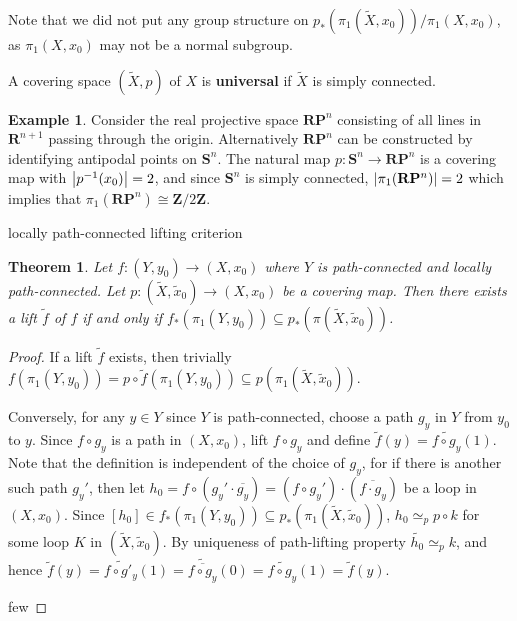 \documentclass[11pt]{article}
\theoremstyle{definition}
\newtheorem*{example}{Example}
\theoremstyle{plain}
\newtheorem{theorem}{Theorem}
\theoremstyle{remark}
\newcommand{\R}{\mathbf{R}}
\newcommand{\Z}{\mathbf{Z}}
\begin{document}
Note that we did not put any group structure on $p_\ast(\pi_1(\widetilde{X},x_0))/\pi_1(X,x_0)$, as $\pi_1(X,x_0)$ may not be a normal subgroup.\medbreak

A covering space $(\widetilde{X},p)$ of $X$ is \textbf{universal} if $\widetilde{X}$ is simply connected.

\begin{example}
Consider the real projective space $\R\mathbf{P}^n$ consisting of all lines in $\R^{n+1}$ passing through the origin. Alternatively $\R\mathbf{P}^n$ can be constructed by identifying antipodal points on $\mathbf{S}^n$. The natural map $p:\mathbf{S}^n\to\R\mathbf{P}^n$ is a covering map with $\abs{p^{-1}(x_0)}=2$, and since $\mathbf{S}^n$ is simply connected, $\abs{\pi_1(\R\mathbf{P}^n)}=2$ which implies that $\pi_1(\R\mathbf{P}^n)\cong\Z/2\Z$.
\end{example}

locally path-connected
lifting criterion

\begin{theorem}
Let $f:(Y,y_0)\to(X,x_0)$ where $Y$ is path-connected and locally path-connected. Let $p:(\widetilde{X},\widetilde{x}_0)\to(X,x_0)$ be a covering map. Then there exists a lift $\widetilde{f}$ of $f$ if and only if $f_\ast(\pi_1(Y,y_0))\subseteq p_\ast(\pi(\widetilde{X},\widetilde{x}_0))$.
\end{theorem}
\begin{proof}
If a lift $\widetilde{f}$ exists, then trivially $f(\pi_1(Y,y_0))=p\circ\widetilde{f}(\pi_1(Y,y_0))\subseteq p(\pi_1(\widetilde{X},\widetilde{x}_0))$.\medbreak

Conversely, for any $y\in Y$ since $Y$ is path-connected, choose a path $g_y$ in $Y$ from $y_0$ to $y$. Since $f\circ g_y$ is a path in $(X,x_0)$, lift $f\circ g_y$ and define $\widetilde{f}(y)=\widetilde{f\circ g_y}(1)$. Note that the definition is independent of the choice of $g_y$, for if there is another such path $g_y'$, then let $h_0=f\circ(g_y'\cdot\overline{g_y})=(f\circ g_y')\cdot(\overline{f\cdot g_y})$ be a loop in $(X,x_0)$. Since $[h_0]\in f_\ast(\pi_1(Y,y_0))\subseteq p_\ast(\pi_1(\widetilde{X},\widetilde{x}_0))$, $h_0\simeq_pp\circ k$ for some loop $K$ in $(\widetilde{X},\widetilde{x}_0)$. By uniqueness of path-lifting property $\widetilde{h_0}\simeq_pk$, and hence $\widetilde{f}(y)=\widetilde{f\circ g'_y}(1)=\widetilde{\overline{f\circ g_y}}(0)=\widetilde{f\circ g_y}(1)=\widetilde{f}(y)$.\medbreak

few
\end{proof}
\end{document}
